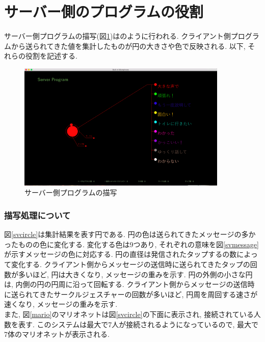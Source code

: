 \documentclass{funthesis}
\begin{document}
\section{サーバー側のプログラムの役割}
サーバー側プログラムの描写(図\ref{server})はのように行われる. クライアント側プログラムから送られてきた値を集計したものが円の大きさや色で反映される. 以下, それらの役割を記述する. 
 \begin{figure}[H]
 \begin{center}
  \includegraphics[width=100mm]{./img/server.png}
 \end{center}
 \caption{サーバー側プログラムの描写}
 \label{server}
\end{figure}

\subsubsection{描写処理について}
図\ref{svcircle}は集計結果を表す円である. 円の色は送られてきたメッセージの多かったものの色に変化する. 変化する色は9つあり, それぞれの意味を図\ref{svmessage}が示すメッセージの色に対応する. 円の直径は発信されたタップするの数によって変化する. クライアント側からメッセージの送信時に送られてきたタップの回数が多いほど, 円は大きくなり, メッセージの重みを示す. 円の外側の小さな円は, 内側の円の円周に沿って回転する. クライアント側からメッセージの送信時に送られてきたサークルジェスチャーの回数が多いほど, 円周を周回する速さが速くなり, メッセージの重みを示す. \\
また, 図\ref{mario}のマリオネットは図\ref{svcircle}の下面に表示され, 接続されている人数を表す. このシステムは最大で7人が接続されるようになっているので, 最大で7体のマリオネットが表示される. 
\end{document}
